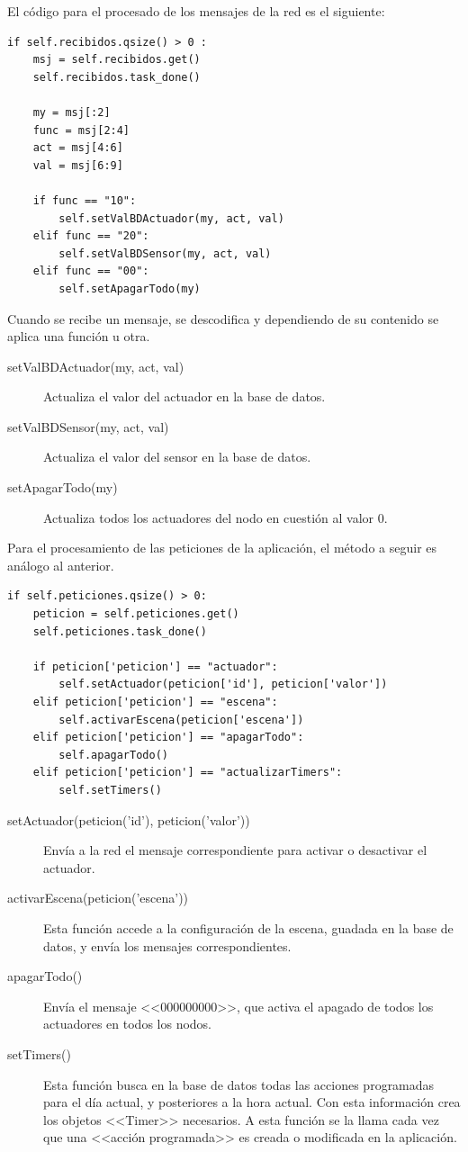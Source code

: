 El código para el procesado de los mensajes de la red es el siguiente:
\begin{lstlisting}
if self.recibidos.qsize() > 0 :
    msj = self.recibidos.get()
    self.recibidos.task_done()

    my = msj[:2]
    func = msj[2:4]
    act = msj[4:6]
    val = msj[6:9]

    if func == "10":
        self.setValBDActuador(my, act, val)
    elif func == "20":
        self.setValBDSensor(my, act, val)
    elif func == "00":
        self.setApagarTodo(my)
\end{lstlisting}

Cuando se recibe un mensaje, se descodifica y dependiendo de su contenido se aplica una función u otra. 

\begin{description}
    \item[setValBDActuador(my, act, val)] Actualiza el valor del actuador en la base de datos.
    \item[setValBDSensor(my, act, val)] Actualiza el valor del sensor en la base de datos.
    \item[setApagarTodo(my)] Actualiza todos los actuadores del nodo en cuestión al valor 0.
\end{description}


Para el procesamiento de las peticiones de la aplicación, el método a seguir es análogo al anterior.
\begin{lstlisting}
if self.peticiones.qsize() > 0:
    peticion = self.peticiones.get()
    self.peticiones.task_done()

    if peticion['peticion'] == "actuador":
        self.setActuador(peticion['id'], peticion['valor'])
    elif peticion['peticion'] == "escena":
        self.activarEscena(peticion['escena'])
    elif peticion['peticion'] == "apagarTodo":
        self.apagarTodo()
    elif peticion['peticion'] == "actualizarTimers":
        self.setTimers()
\end{lstlisting}
 
 \begin{description}
     \item[ setActuador(peticion('id'), peticion('valor')) ] Envía a la red el mensaje correspondiente para activar o desactivar el actuador.
     \item[activarEscena(peticion('escena'))] Esta función accede a la configuración de la escena, guadada en la base de datos, y envía los mensajes correspondientes.
     \item[apagarTodo()] Envía el mensaje <<000000000>>, que activa el apagado de todos los actuadores en todos los nodos.
     \item[setTimers()] Esta función busca en la base de datos todas las acciones programadas para el día actual, y posteriores a la hora actual. Con esta información crea los objetos <<Timer>> necesarios.  A esta función se la llama cada vez que una <<acción programada>> es creada o modificada en la aplicación.
    \end{description}
    
